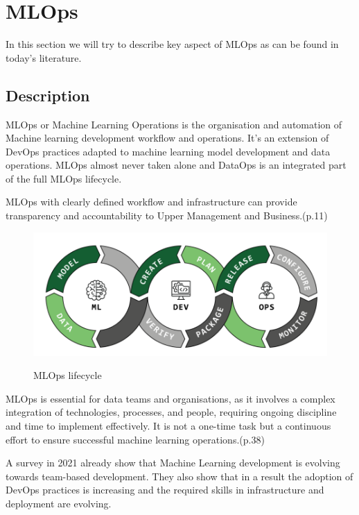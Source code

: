 \section{MLOps}\label{sec:mlops}

In this section we will try to describe key aspect of MLOps as can be found in today's literature.

\subsection{Description}\label{subsec:description}
MLOps or Machine Learning Operations is the organisation and automation of Machine learning development workflow and operations.
It's an extension of DevOps practices adapted to machine learning model development and data operations\cite{Kreuzberger2022MachineLO}.
MLOps almost never taken alone and DataOps is an integrated part of the full MLOps lifecycle.

MLOps with clearly defined workflow and infrastructure can provide transparency and accountability to Upper Management and Business.\cite{treveil2020introducing}(p.11)

\begin{figure}[!htbp]
    \caption{MLOps lifecycle\cite{mlops-definition-tools-and-challenge}}
    \centering
    \includegraphics[scale=0.5]{images/ml-dev-ops}
    \label{fig:ml-dev-ops}
\end{figure}

MLOps is essential for data teams and organisations, as it involves a complex integration of technologies, processes, and people, requiring ongoing discipline and time to implement effectively.
It is not a one-time task but a continuous effort to ensure successful machine learning operations.\cite{treveil2020introducing}(p.38)

A survey in 2021\cite{DBLP:journals/corr/abs-2103-08942} already show that Machine Learning development is evolving towards team-based development.
They also show that in a result the adoption of DevOps practices is increasing and the required skills in infrastructure and deployment are evolving.

